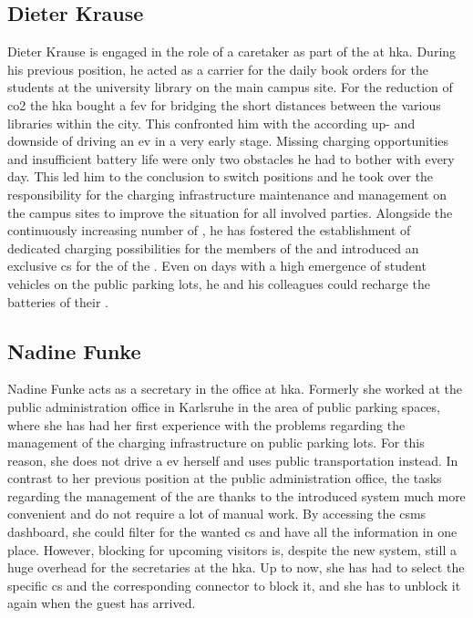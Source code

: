 \subsection{Dieter Krause}
\label{ch:Requirements Engineering:sec:Personas:ssec:Dieter Krause}

Dieter Krause is engaged in the role of a caretaker as part of the  at \acrshort{hka}. During his previous position, he acted as a carrier for the daily book orders for the students at the university library on the main campus site. 
For the reduction of \acrshort{co2} the \acrshort{hka} bought a \acrshort{fev} for bridging the short distances between the various libraries within the city.
This confronted him with the according up- and downside of driving an \acrshort{ev} in a very early stage.
Missing charging opportunities and insufficient battery life were only two obstacles he had to bother with every day. This led him to the conclusion to switch positions and he took over the responsibility for the charging infrastructure maintenance and management on the campus sites to improve the situation for all involved parties.
Alongside the continuously increasing number of , he has fostered the establishment of dedicated charging possibilities for the members of the  and introduced an exclusive \acrshort{cs} for the  of the . 
Even on days with a high emergence of student vehicles on the public parking lots, he and his colleagues could recharge the batteries of their . 

\subsection{Nadine Funke}
\label{ch:Requirements Engineering:sec:Personas:ssec:Nadine Funke}

Nadine Funke acts as a secretary in the  office at \acrshort{hka}. Formerly she worked at the public administration office in Karlsruhe in the area of public parking spaces, where she has had her first experience with the problems regarding the management of the charging infrastructure on public parking lots.
For this reason, she does not drive a \acrshort{ev} herself and uses public transportation instead. In contrast to her previous position at the public administration office, the tasks regarding the management of the  are thanks to the introduced system much more convenient and do not require a lot of manual work.
By accessing the \acrshort{csms} dashboard, she could filter for the wanted \acrshort{cs} and have all the information in one place.
However, blocking  for upcoming visitors is, despite the new system, still a huge overhead for the secretaries at the \acrshort{hka}.
Up to now, she has had to select the specific \acrshort{cs} and the corresponding connector to block it, and she has to unblock it again when the guest has arrived.

